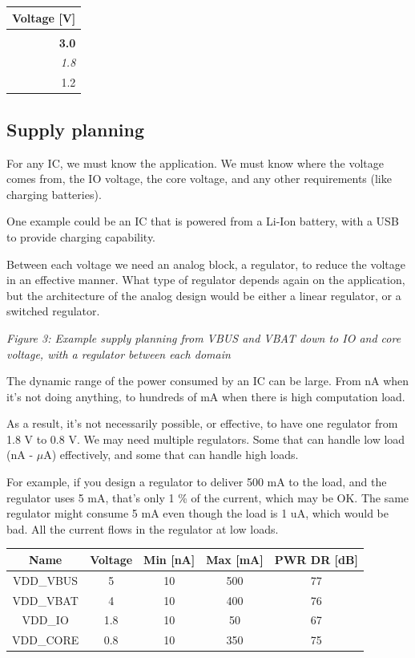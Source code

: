\begin{longtable}[]{@{}r@{}}
\toprule\noalign{}
Voltage {[}V{]} \\
\midrule\noalign{}
\endhead
\bottomrule\noalign{}
\endlastfoot
5.0 \\
\textbf{3.0} \\
\emph{1.8} \\
1.2 \\
\end{longtable}

\subsection{Supply planning}\label{supply-planning}

For any IC, we must know the application. We must know where the voltage
comes from, the IO voltage, the core voltage, and any other requirements
(like charging batteries).

One example could be an IC that is powered from a Li-Ion battery, with a
USB to provide charging capability.

Between each voltage we need an analog block, a regulator, to reduce the
voltage in an effective manner. What type of regulator depends again on
the application, but the architecture of the analog design would be
either a linear regulator, or a switched regulator.


{
\centering
{}
}

\emph{Figure 3: Example supply planning from VBUS and VBAT down to IO
and core voltage, with a regulator between each domain}

The dynamic range of the power consumed by an IC can be large. From nA
when it's not doing anything, to hundreds of mA when there is high
computation load.

As a result, it's not necessarily possible, or effective, to have one
regulator from 1.8 V to 0.8 V. We may need multiple regulators. Some
that can handle low load (nA - \(\mu\)A) effectively, and some that can
handle high loads.

For example, if you design a regulator to deliver 500 mA to the load,
and the regulator uses 5 mA, that's only 1 \% of the current, which may
be OK. The same regulator might consume 5 mA even though the load is 1
uA, which would be bad. All the current flows in the regulator at low
loads.

\begin{longtable}[]{@{}ccccc@{}}
\toprule\noalign{}
Name & Voltage & Min {[}nA{]} & Max {[}mA{]} & PWR DR {[}dB{]} \\
\midrule\noalign{}
\endhead
\bottomrule\noalign{}
\endlastfoot
VDD\_VBUS & 5 & 10 & 500 & 77 \\
VDD\_VBAT & 4 & 10 & 400 & 76 \\
VDD\_IO & 1.8 & 10 & 50 & 67 \\
VDD\_CORE & 0.8 & 10 & 350 & 75 \\
\end{longtable}


